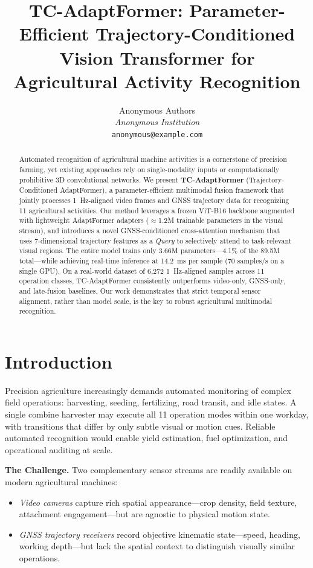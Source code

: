 \documentclass[10pt,twocolumn]{article}
\title{\textbf{TC-AdaptFormer}: Parameter-Efficient Trajectory-Conditioned \\
Vision Transformer for Agricultural Activity Recognition}
\author{Anonymous Authors\\
\textit{Anonymous Institution}\\
\texttt{anonymous@example.com}}
\date{}
\begin{document}
\maketitle

\begin{abstract}
Automated recognition of agricultural machine activities is a cornerstone of precision farming, yet existing approaches rely on single-modality inputs or computationally prohibitive 3D convolutional networks. We present \textbf{TC-AdaptFormer} (Trajectory-Conditioned AdaptFormer), a parameter-efficient multimodal fusion framework that jointly processes 1~Hz-aligned video frames and GNSS trajectory data for recognizing 11 agricultural activities. Our method leverages a frozen ViT-B16 backbone augmented with lightweight AdaptFormer adapters ($\approx$1.2M trainable parameters in the visual stream), and introduces a novel GNSS-conditioned cross-attention mechanism that uses 7-dimensional trajectory features as a \emph{Query} to selectively attend to task-relevant visual regions. The entire model trains only 3.66M parameters---4.1\% of the 89.5M total---while achieving real-time inference at 14.2~ms per sample (70 samples/s on a single GPU). On a real-world dataset of 6,272 1~Hz-aligned samples across 11 operation classes, TC-AdaptFormer consistently outperforms video-only, GNSS-only, and late-fusion baselines. Our work demonstrates that strict temporal sensor alignment, rather than model scale, is the key to robust agricultural multimodal recognition.
\end{abstract}

\section{Introduction}

Precision agriculture increasingly demands automated monitoring of complex field operations: harvesting, seeding, fertilizing, road transit, and idle states. A single combine harvester may execute all 11 operation modes within one workday, with transitions that differ by only subtle visual or motion cues. Reliable automated recognition would enable yield estimation, fuel optimization, and operational auditing at scale.

\textbf{The Challenge.} Two complementary sensor streams are readily available on modern agricultural machines:
\begin{itemize}
  \item \emph{Video cameras} capture rich spatial appearance---crop density, field texture, attachment engagement---but are agnostic to physical motion state.
  \item \emph{GNSS trajectory receivers} record objective kinematic state---speed, heading, working depth---but lack the spatial context to distinguish visually similar operations.
\end{itemize}
\end{document}
